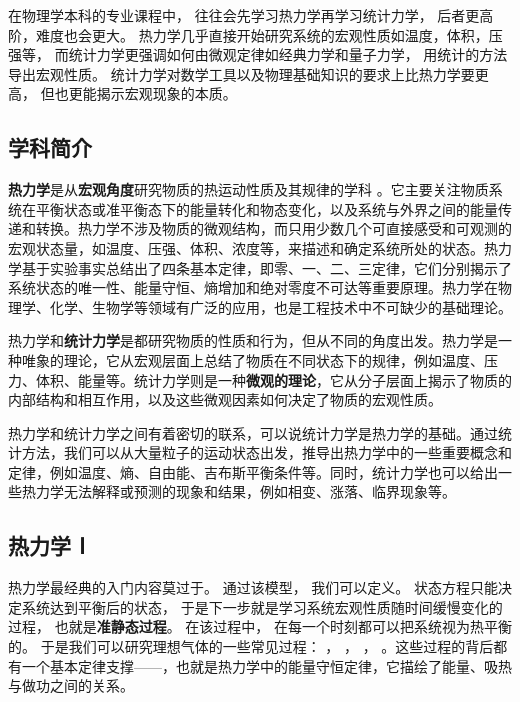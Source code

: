 
\begin{issues}
\issueDraft
\end{issues}


在物理学本科的专业课程中， 往往会先学习热力学再学习统计力学， 后者更高阶，难度也会更大。 热力学几乎直接开始研究系统的宏观性质如温度，体积，压强等， 而统计力学更强调如何由微观定律如经典力学和量子力学， 用统计的方法导出宏观性质。 统计力学对数学工具以及物理基础知识的要求上比热力学要更高， 但也更能揭示宏观现象的本质。

\subsection{学科简介}
\textbf{热力学}是从\textbf{宏观角度}研究物质的热运动性质及其规律的学科 。它主要关注物质系统在平衡状态或准平衡态下的能量转化和物态变化，以及系统与外界之间的能量传递和转换。热力学不涉及物质的微观结构，而只用少数几个可直接感受和可观测的宏观状态量，如温度、压强、体积、浓度等，来描述和确定系统所处的状态。热力学基于实验事实总结出了四条基本定律，即零、一、二、三定律，它们分别揭示了系统状态的唯一性、能量守恒、熵增加和绝对零度不可达等重要原理。热力学在物理学、化学、生物学等领域有广泛的应用，也是工程技术中不可缺少的基础理论。

热力学和\textbf{统计力学}是都研究物质的性质和行为，但从不同的角度出发。热力学是一种唯象的理论，它从宏观层面上总结了物质在不同状态下的规律，例如温度、压力、体积、能量等。统计力学则是一种\textbf{微观的理论}，它从分子层面上揭示了物质的内部结构和相互作用，以及这些微观因素如何决定了物质的宏观性质。

热力学和统计力学之间有着密切的联系，可以说统计力学是热力学的基础。通过统计方法，我们可以从大量粒子的运动状态出发，推导出热力学中的一些重要概念和定律，例如温度、熵、自由能、吉布斯平衡条件等。同时，统计力学也可以给出一些热力学无法解释或预测的现象和结果，例如相变、涨落、临界现象等。


\subsection{热力学 Ⅰ}
热力学最经典的入门内容莫过于。 通过该模型， 我们可以定义。 状态方程只能决定系统达到平衡后的状态， 于是下一步就是学习系统宏观性质随时间缓慢变化的过程， 也就是\textbf{准静态过程}。 在该过程中， 在每一个时刻都可以把系统视为热平衡的。 于是我们可以研究理想气体的一些常见过程： ， ， ， 。这些过程的背后都有一个基本定律支撑——，也就是热力学中的能量守恒定律，它描绘了能量、吸热与做功之间的关系。

